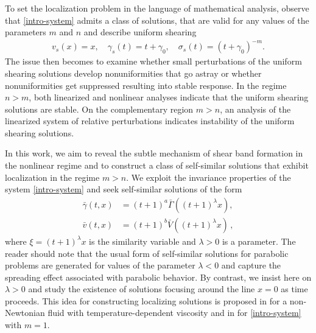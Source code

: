 \documentclass[a4paper,11pt]{article}
\def\bG{\bar{\Gamma}}
\def\bV{\bar{V}}
\numberwithin{step}{dummy}
\begin{document}
To set the localization problem in the language of mathematical analysis, observe that
\eqref{intro-system} admits a class of solutions,  that are valid for any values of the parameters $m$ and $n$ and describe uniform shearing 
\begin{align}
\label{intro-uss}
 v_s(x) = x, \quad \gamma_s(t) = t + \gamma_0, \quad \sigma_s (t)  = (t + \gamma_0)^{-m}.
\end{align}
The issue then becomes to examine whether small perturbations of the uniform shearing solutions develop nonuniformities that go astray or whether nonuniformities
get suppressed resulting into  stable response. In the regime $n > m$, both  linearized and nonlinear analyses
\cite{tzavaras_plastic_1986, fressengeas_instability_1987, shawki_shear_1989, tzavaras_strain_1991, tzavaras_nonlinear_1992} indicate that the
uniform shearing solutions are stable.
On the complementary region $m > n$, an analysis of the linearized system of relative perturbations \cite{fressengeas_instability_1987, molinari_analytical_1987, tzavaras_nonlinear_1992} indicates instability of the uniform shearing solutions.


In this work, we aim to reveal the subtle mechanism of shear band formation in the nonlinear regime and to construct a class of self-similar solutions
that exhibit localization in the regime $m > n$. We exploit the invariance properties of the system \eqref{intro-system} and seek self-similar
solutions of the form
\begin{equation} \label{intro-ss}
\begin{aligned}
 \bar{ \gamma }(t,x) &=  (t + 1)^a\bG((t+1)^ \lambda x),\\
 \bar{v}(t,x)&= (t + 1)^b\bV((t+1)^ \lambda x) \, , 
\end{aligned}
\end{equation}
where  $\xi=(t+1)^ \lambda x$ is the similarity variable and $\lambda > 0$ is a parameter.  The reader should note that the usual form of self-similar solutions
for parabolic problems are generated for values of the parameter $\lambda < 0$ and capture the spreading effect associated with parabolic behavior. 
By contrast, we insist here on $\lambda > 0$ and study the existence of solutions focusing around the line $x =0$ as time proceeds. 
This idea for constructing localizing solutions is proposed  in \cite{katsaounis_emergence_2014} for a non-Newtonian fluid with temperature-dependent viscosity 
and in \cite{KLT_2016} for \eqref{intro-system} with $m=1$.
\end{document}
